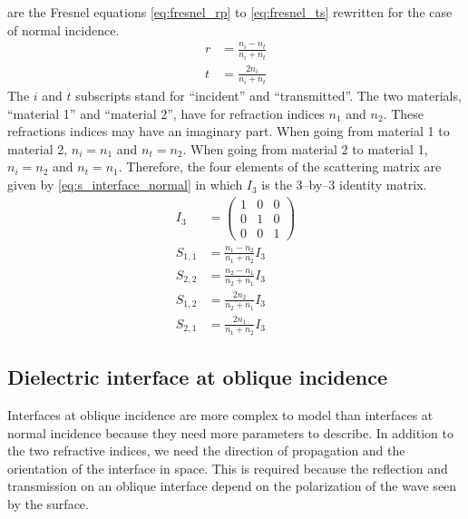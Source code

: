  are the Fresnel equations \eqref{eq:fresnel_rp} to \eqref{eq:fresnel_ts} rewritten for the case of normal incidence.
\begin{subequations}
    \label{eq:fresnel_normal}
    \begin{align}
        r &= \frac{n_i - n_t}{n_i + n_t} \label{eq:fresnel_normal_r}\\
        t &= \frac{2 n_i}{n_i + n_t} \label{eq:fresnel_normal_t}
    \end{align}
\end{subequations}
The $i$ and $t$ subscripts stand for ``incident'' and ``transmitted''.
The two materials, ``material 1'' and ``material 2'', have for refraction indices $n_1$ and $n_2$.
These refractions indices may have an imaginary part.
When going from material 1 to material 2, $n_i = n_1$ and $n_t = n_2$.
When going from material 2 to material 1, $n_i = n_2$ and $n_t = n_1$.
Therefore, the four elements of the scattering matrix are given by \cref{eq:s_interface_normal} in which $I_3$ is the 3--by--3 identity matrix.
\begin{subequations}
    \label{eq:s_interface_normal}
    \begin{align}
        I_3 &= \begin{pmatrix} 1&0&0\\0&1&0\\0&0&1 \end{pmatrix}
        \\
        S_{1, 1} &= \frac{n_1 - n_2}{n_1 + n_2} I_3
        \\
        S_{2, 2} &= \frac{n_2 - n_1}{n_2 + n_1} I_3
        \\
        S_{1, 2} &= \frac{2 n_2}{n_2 + n_1} I_3
        \\
        S_{2, 1} &= \frac{2 n_1}{n_1 + n_2} I_3
    \end{align}
\end{subequations}





\clearpage
\subsection{Dielectric interface at oblique incidence}
\label{sec:interface_at_oblique_incidence}
Interfaces at oblique incidence are more complex to model than interfaces at normal incidence because they need more parameters to describe.
In addition to the two refractive indices, we need the direction of propagation and the orientation of the interface in space.
This is required because the reflection and transmission on an oblique interface depend on the polarization of the wave seen by the surface.

